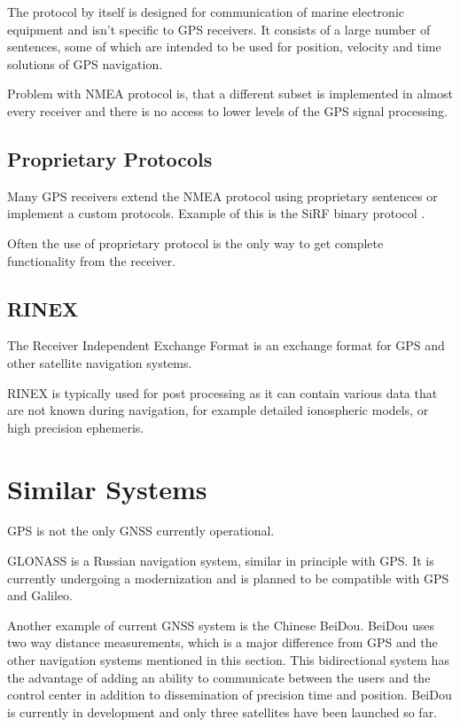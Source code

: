 The protocol by itself is designed for communication of marine electronic
equipment and isn't specific to GPS receivers.
It consists of a large number of sentences, some of which are intended to be used
for position, velocity and time solutions of GPS navigation.

Problem with NMEA protocol is, that a different subset is implemented in almost every
receiver and there is no access to lower levels of the GPS signal processing.

\subsection{Proprietary Protocols}
Many GPS receivers extend the NMEA protocol using proprietary sentences or
implement a custom protocols.
Example of this is the SiRF binary protocol \cite{sirf-protocol}.

Often the use of proprietary protocol is the only way to get complete functionality from
the receiver.

\subsection{RINEX}

The Receiver Independent Exchange Format \cite{rinex-format} is an exchange format
for GPS and other satellite navigation systems.

RINEX is typically used for post processing as it can contain various data that are not
known during navigation, for example detailed ionospheric models, or high precision ephemeris.

\section{Similar Systems}

GPS is not the only GNSS currently operational.

GLONASS \cite{glonass} is a Russian navigation system, similar in principle with GPS.
It is currently undergoing a modernization and is planned to be compatible with GPS and Galileo.

Another example of current GNSS system is the Chinese BeiDou.
BeiDou uses two way distance measurements, which is a major difference from GPS and the other navigation
systems mentioned in this section.
This bidirectional system has the advantage of adding an ability to communicate between the
users and the control center in addition to dissemination of precision time and position.
BeiDou is currently in development and only three satellites have been launched so far.


